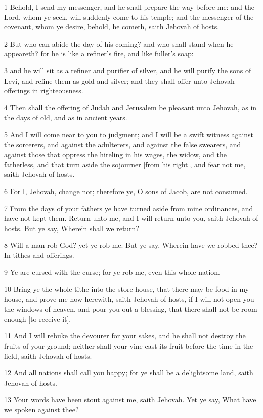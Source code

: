 \par 1 Behold, I send my messenger, and he shall prepare the way before me: and the Lord, whom ye seek, will suddenly come to his temple; and the messenger of the covenant, whom ye desire, behold, he cometh, saith Jehovah of hosts.
\par 2 But who can abide the day of his coming? and who shall stand when he appeareth? for he is like a refiner's fire, and like fuller's soap:
\par 3 and he will sit as a refiner and purifier of silver, and he will purify the sons of Levi, and refine them as gold and silver; and they shall offer unto Jehovah offerings in righteousness.
\par 4 Then shall the offering of Judah and Jerusalem be pleasant unto Jehovah, as in the days of old, and as in ancient years.
\par 5 And I will come near to you to judgment; and I will be a swift witness against the sorcerers, and against the adulterers, and against the false swearers, and against those that oppress the hireling in his wages, the widow, and the fatherless, and that turn aside the sojourner [from his right], and fear not me, saith Jehovah of hosts.
\par 6 For I, Jehovah, change not; therefore ye, O sons of Jacob, are not consumed.
\par 7 From the days of your fathers ye have turned aside from mine ordinances, and have not kept them. Return unto me, and I will return unto you, saith Jehovah of hosts. But ye say, Wherein shall we return?
\par 8 Will a man rob God? yet ye rob me. But ye say, Wherein have we robbed thee? In tithes and offerings.
\par 9 Ye are cursed with the curse; for ye rob me, even this whole nation.
\par 10 Bring ye the whole tithe into the store-house, that there may be food in my house, and prove me now herewith, saith Jehovah of hosts, if I will not open you the windows of heaven, and pour you out a blessing, that there shall not be room enough [to receive it].
\par 11 And I will rebuke the devourer for your sakes, and he shall not destroy the fruits of your ground; neither shall your vine cast its fruit before the time in the field, saith Jehovah of hosts.
\par 12 And all nations shall call you happy; for ye shall be a delightsome land, saith Jehovah of hosts.
\par 13 Your words have been stout against me, saith Jehovah. Yet ye say, What have we spoken against thee?
